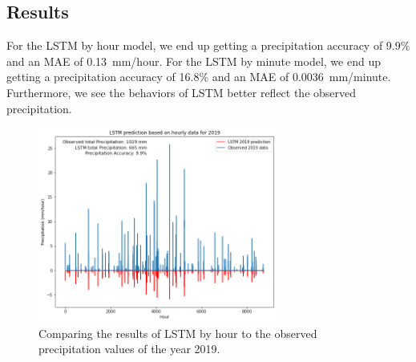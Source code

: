 \documentclass[11pt]{report}
\begin{document}
\subsection{Results}
For the LSTM by hour model, we end up getting a precipitation accuracy of 9.9\% and an MAE of 0.13~mm/hour. For the LSTM by minute model, we end up getting a precipitation accuracy of 16.8\% and an MAE of 0.0036~mm/minute. Furthermore, we see the behaviors of LSTM better reflect the observed precipitation. 
\clearpage
\begin{figure}[th!]
	\centering
	\includegraphics[width = 0.7\textwidth]{Figures/LSTM_hour.png}
	\caption[Comparing LSTM results to observed precipitation in 2019 by hour]{\label{LSTM_hour} Comparing the results of LSTM by hour to the observed
		 precipitation values of the year 2019.
	}
\end{figure}
\end{document}
